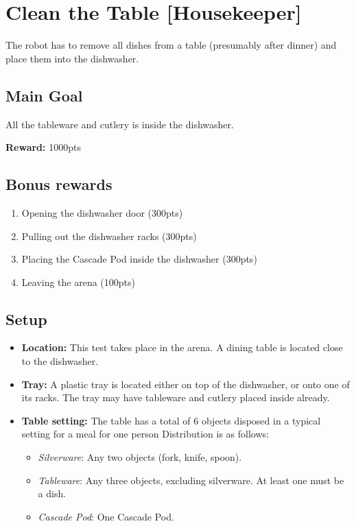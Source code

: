 \section{Clean the Table [Housekeeper]}
The robot has to remove all dishes from a table (presumably after dinner) and place them into the dishwasher.


\subsection{Main Goal}
All the tableware and cutlery is inside the dishwasher.

\noindent\textbf{Reward:} 1000pts

\subsection{Bonus rewards}
\begin{enumerate}[nosep]
	\item Opening the dishwasher door (300pts)
	\item Pulling out the dishwasher racks (300pts)
	\item Placing the Cascade Pod inside the dishwasher (300pts)
	\item Leaving the arena (100pts)
\end{enumerate}

\subsection{Setup}
\begin{itemize}[nosep]
	\item \textbf{Location:} This test takes place in the arena. A dining table is located close to the dishwasher.
	\item \textbf{Tray:} A plastic tray is located either on top of the dishwasher, or onto one of its racks. The tray may have tableware and cutlery placed inside already.
	\item \textbf{Table setting:} The table has a total of 6 objects disposed in a typical setting for a meal for one person
	Distribution is as follows:
	\begin{itemize}[nosep]
		\item\textit{Silverware}: Any two objects (fork, knife, spoon).
		\item\textit{Tableware}: Any three objects, excluding silverware. At least one must be a dish.
		\item\textit{Cascade Pod}: One Cascade Pod.
	\end{itemize}
\end{itemize}


